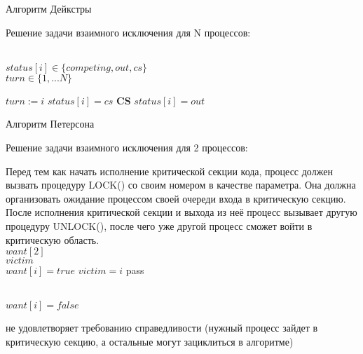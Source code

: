 \begin{algorithm}
\caption{Алгоритм Дейкстры}
Решение задачи взаимного исключения для N процессов: 
\label{algDijkstra}
\begin{algorithmic}
\Ensure \\$status[i] \in \{competing, out, cs\}$ \\
$turn \in \{1,...N\}$ 

\Do

      \State $turn := i$
    \EndIf
  \EndWhile
  \State $status[i] = cs$
\State \textbf{CS}
\State $status[i] = out$
\end{algorithmic}
\end{algorithm}

\begin{algorithm}
\caption{Алгоритм Петерсона}
Решение задачи взаимного исключения для 2 процессов: 
\label{algPeterson}
\begin{algorithmic}
\State Перед тем как начать исполнение критической секции кода, процесс должен вызвать процедуру LOCK() со своим номером в качестве параметра. Она должна организовать ожидание процессом своей очереди входа в критическую секцию. После исполнения критической секции и выхода из неё процесс вызывает другую процедуру UNLOCK(), после чего уже другой процесс сможет войти в критическую область. 
\Ensure \\$want[2]$ \\ 
$victim$ \\ 
  \State $want[i] = true$  
  \State $victim = i$
    \State pass
  \EndWhile
\EndProcedure

\\
  \State $want[i] = false$
\EndProcedure
\end{algorithmic}
\end{algorithm}


 не удовлетворяет требованию справедливости (нужный процесс зайдет в критическую секцию, а остальные могут зациклиться в алгоритме)
